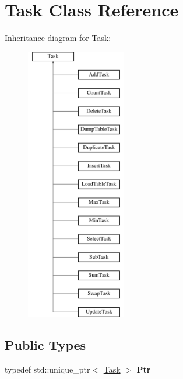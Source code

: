 \hypertarget{class_task}{}\section{Task Class Reference}
\label{class_task}
Inheritance diagram for Task\+:\begin{figure}[H]
\begin{center}
\leavevmode
\includegraphics[height=12.000000cm]{class_task}
\end{center}
\end{figure}
\subsection*{Public Types}
\begin{DoxyCompactItemize}
\item 
\mbox{\label{class_task_a636a488a23020fcac3380e0fc876e55c}} 
typedef std\+::unique\+\_\+ptr$<$ \hyperlink{class_task}{Task} $>$ {\bfseries Ptr}
\end{DoxyCompactItemize}
